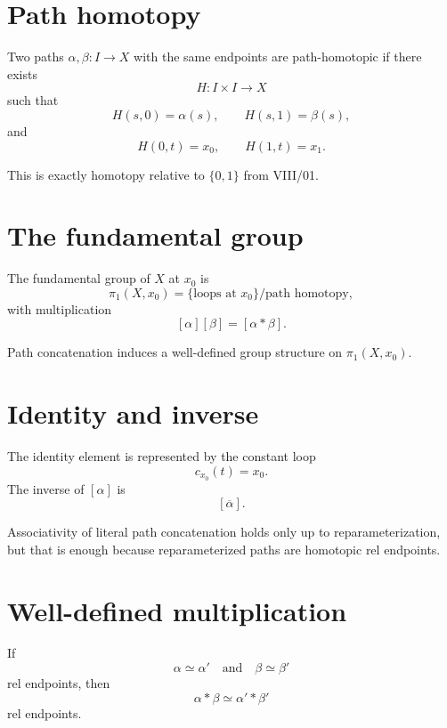 \section{Path homotopy}

\begin{definition}
\label{def:viii09-path-homotopy}
Two paths \(\alpha,\beta:I\to X\) with the same endpoints are path-homotopic if
there exists
\[
H:I\times I\to X
\]
such that
\[
H(s,0)=\alpha(s),
\qquad
H(s,1)=\beta(s),
\]
and
\[
H(0,t)=x_0,
\qquad
H(1,t)=x_1.
\]
\end{definition}

This is exactly homotopy relative to \(\{0,1\}\) from VIII/01.

\section{The fundamental group}

\begin{definition}
\label{def:viii09-pi1}
The fundamental group of \(X\) at \(x_0\) is
\[
\pi_1(X,x_0)
=
\{\text{loops at }x_0\}/\text{path homotopy},
\]
with multiplication
\[
[\alpha][\beta]=[\alpha*\beta].
\]
\end{definition}

\begin{theorem}
\label{thm:viii09-group}
Path concatenation induces a well-defined group structure on
\(\pi_1(X,x_0)\).
\end{theorem}

\section{Identity and inverse}

The identity element is represented by the constant loop
\[
c_{x_0}(t)=x_0.
\]
The inverse of \([\alpha]\) is
\[
[\overline\alpha].
\]

Associativity of literal path concatenation holds only up to reparameterization,
but that is enough because reparameterized paths are homotopic rel endpoints.

\section{Well-defined multiplication}

\begin{proposition}
\label{prop:viii09-well-defined}
If
\[
\alpha\simeq\alpha'
\quad\text{and}\quad
\beta\simeq\beta'
\]
rel endpoints, then
\[
\alpha*\beta\simeq\alpha'*\beta'
\]
rel endpoints.
\end{proposition}

